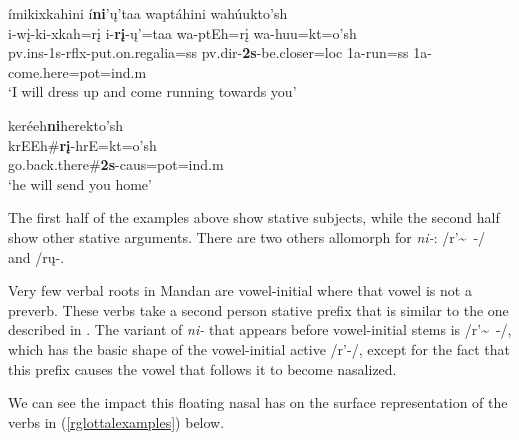 \begin{exe}
\begin{xlist}
	\item \glll ímikixkahini í\textbf{ni}'ų'taa waptáhini wahúukto'sh\\
	i-wį-ki-xkah=rį i-\textbf{rį}-ų'=taa wa-ptEh=rį wa-huu=kt=o'sh\\
	pv.ins-1s-rflx-\textnormal{put.on.regalia}=ss pv.dir-\textbf{2s}-\textnormal{be.closer}=loc 1a-\textnormal{run}=ss 1a-\textnormal{come.here}=pot=ind.m\\
	\glt `I will dress up and come running towards you' \citep[70]{hollow1973b}
	
	\item \glll keréeh\textbf{ni}herekto'sh\\
	krEEh\#\textbf{rį}-hrE=kt=o'sh\\
	\textnormal{go.back.there}\#\textbf{2s}-caus=pot=ind.m\\
	\glt `he will send you home' \citep[219]{hollow1973b}
	
	\end{xlist}

\end{exe}

The first half of the examples above show stative subjects, while the second half show other stative arguments. There are two others allomorph for \textit{ni-}: /r'\~~-/ and /rų-.

\label{rglottalnasal}

Very few verbal roots in Mandan are vowel-initial where that vowel is not a preverb. These verbs take a second person stative prefix that is similar to the one described in . The variant of \textit{ni-} that appears before vowel-initial stems is /r'\~~-/, which has the basic shape of the vowel-initial active /r'-/, except for the fact that this prefix causes the vowel that follows it to become nasalized.

We can see the impact this floating nasal has on the surface representation of the verbs in (\ref{rglottalexamples}) below.

